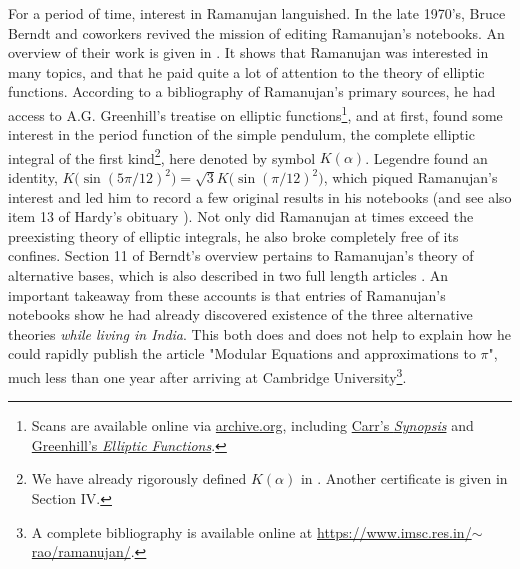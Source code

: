\documentclass[nofootinbib,preprint]{revtex4-1}
\begin{document}
For a period of time, interest in Ramanujan languished. In the late 1970's, Bruce Berndt and coworkers 
revived the mission of editing Ramanujan's notebooks. An overview of their work is given in 
\cite{BERNDTOVERVIEW}. It shows that Ramanujan was interested in many topics, and that he paid 
quite a lot of attention to the theory of elliptic functions. According to a bibliography of Ramanujan's primary 
sources\cite{BERNDTBOOKLIST}, he had access to A.G. Greenhill's treatise on elliptic functions\footnote{Scans 
are available online via \href{https://archive.org/details/asynopsiselemen00carrgoog}{archive.org},
including \href{https://archive.org/details/asynopsiselemen00carrgoog}{Carr's \textit{Synopsis}}
and \href{https://archive.org/details/cu31924001588395}{Greenhill's \textit{Elliptic Functions}}.
}, and at first, found some interest in the period function of the simple pendulum, the complete elliptic integral of 
the first kind\footnote{We have already rigorously defined $K(\alpha)$ in \cite{KLEE2020Prelude,KLEE2020Pendulum}. 
Another certificate is given in Section IV.}, here denoted by symbol $K(\alpha)$.
Legendre found an identity, $K\big(\sin(5\pi/12)^2\big)=\sqrt{3}K\big(\sin(\pi/12)^2\big)$, which 
piqued Ramanujan's interest and led him to record a few original results in his notebooks\cite{VILLARINO2020}
(and see also item 13 of Hardy's obituary \cite{HARDY1937}). Not only did Ramanujan at times exceed the preexisting 
theory of elliptic integrals, he also broke completely free of its confines. Section 11 of Berndt's 
overview pertains to Ramanujan's theory of alternative bases, which is also described in two full 
length articles \cite{BERNDTALTERNATIVE,BARUAH2009}. An important takeaway from these accounts is that entries of 
Ramanujan's notebooks show he had already discovered existence of the three alternative theories 
\textit{while living in India}. This both does and does not help to explain how he could rapidly 
publish the article "Modular Equations and approximations to $\pi$", much less than one year 
after arriving at Cambridge University\footnote{A complete bibliography is available online at 
\href{https://www.imsc.res.in/~rao/ramanujan/}{https://www.imsc.res.in/$\scriptstyle\sim$rao/ramanujan/}.}\cite{RAMANUJAN1914}.
\end{document}
